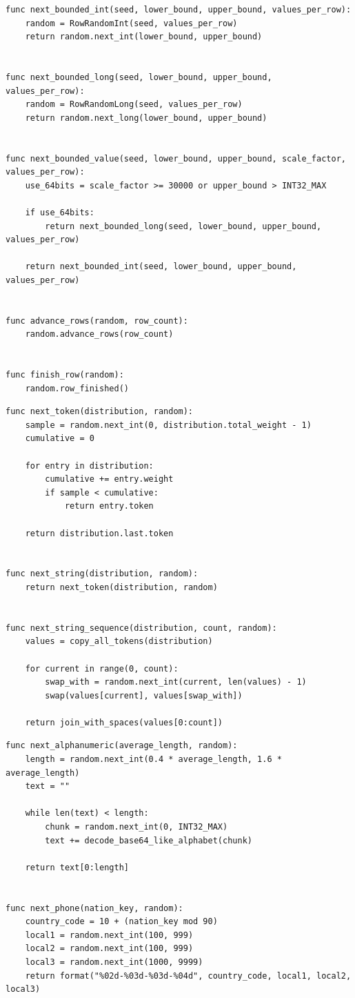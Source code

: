 \begin{lstlisting}[caption={Генерация ограниченных числовых значений}]
func next_bounded_int(seed, lower_bound, upper_bound, values_per_row):
    random = RowRandomInt(seed, values_per_row)
    return random.next_int(lower_bound, upper_bound)


func next_bounded_long(seed, lower_bound, upper_bound, values_per_row):
    random = RowRandomLong(seed, values_per_row)
    return random.next_long(lower_bound, upper_bound)


func next_bounded_value(seed, lower_bound, upper_bound, scale_factor, values_per_row):
    use_64bits = scale_factor >= 30000 or upper_bound > INT32_MAX

    if use_64bits:
        return next_bounded_long(seed, lower_bound, upper_bound, values_per_row)

    return next_bounded_int(seed, lower_bound, upper_bound, values_per_row)


func advance_rows(random, row_count):
    random.advance_rows(row_count)


func finish_row(random):
    random.row_finished()
\end{lstlisting}

\begin{lstlisting}[caption={Генерация строк из распределений}]
func next_token(distribution, random):
    sample = random.next_int(0, distribution.total_weight - 1)
    cumulative = 0

    for entry in distribution:
        cumulative += entry.weight
        if sample < cumulative:
            return entry.token

    return distribution.last.token


func next_string(distribution, random):
    return next_token(distribution, random)


func next_string_sequence(distribution, count, random):
    values = copy_all_tokens(distribution)

    for current in range(0, count):
        swap_with = random.next_int(current, len(values) - 1)
        swap(values[current], values[swap_with])

    return join_with_spaces(values[0:count])
\end{lstlisting}

\begin{lstlisting}[caption={Генерация символьных и телефонных значений}]
func next_alphanumeric(average_length, random):
    length = random.next_int(0.4 * average_length, 1.6 * average_length)
    text = ""

    while len(text) < length:
        chunk = random.next_int(0, INT32_MAX)
        text += decode_base64_like_alphabet(chunk)

    return text[0:length]


func next_phone(nation_key, random):
    country_code = 10 + (nation_key mod 90)
    local1 = random.next_int(100, 999)
    local2 = random.next_int(100, 999)
    local3 = random.next_int(1000, 9999)
    return format("%02d-%03d-%03d-%04d", country_code, local1, local2, local3)
\end{lstlisting}

